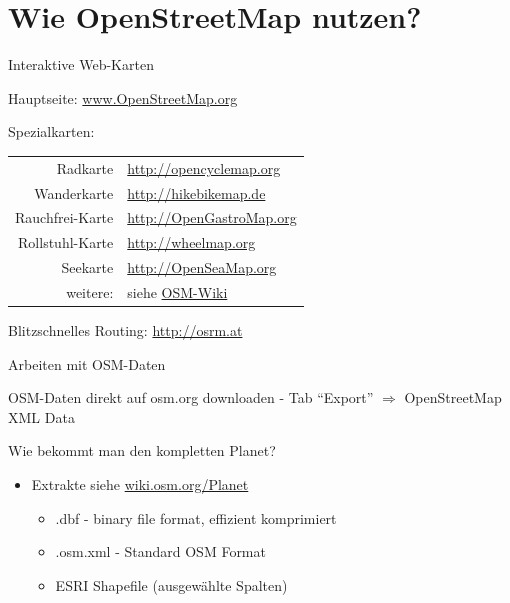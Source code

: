 \documentclass{beamer}
\begin{document}
\section{Wie OpenStreetMap nutzen?}

\begin{frame}{Interaktive Web-Karten}

Hauptseite: \href{http://osm.org}{www.OpenStreetMap.org}

\vspace{7mm}

Spezialkarten:
  \begin{table}[htbp]
    \centering
    \begin{tabular}{r|l}
      Radkarte  &  \url{http://opencyclemap.org} \\
      Wanderkarte & \url{http://hikebikemap.de} \\
      Rauchfrei-Karte & \url{http://OpenGastroMap.org} \\
      Rollstuhl-Karte & \url{http://wheelmap.org} \\
      Seekarte & \url{http://OpenSeaMap.org} \\
\pause
      200 weitere: & siehe \href{http://wiki.openstreetmap.org/wiki/List\_of\_OSM\_based\_Services}{OSM-Wiki} \\
    \end{tabular}
  \end{table}

Blitzschnelles Routing: \url{http://osrm.at}

\end{frame}

\begin{frame}{Arbeiten mit OSM-Daten}

OSM-Daten direkt auf osm.org downloaden - Tab ``Export'' $\Rightarrow$ OpenStreetMap XML Data

\pause
\vspace{8mm}
Wie bekommt man den kompletten Planet?

\begin{itemize}
  \item Extrakte siehe \href{http://wiki.osm.org/Planet}{wiki.osm.org/Planet}
  \begin{itemize}
    \item .dbf - binary file format, effizient komprimiert
    \item .osm.xml - Standard OSM Format
    \item ESRI Shapefile (ausgewählte Spalten)
  \end{itemize}
\end{itemize}

\end{frame}
\end{document}
